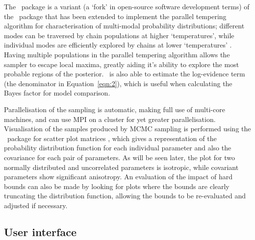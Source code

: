 \documentclass[pdf,preprint]{iucr}
\begin{document}
The \ptemcee\ package is a variant (a `fork' in open-source software development terms) of the \emcee\ package that has been extended to implement the parallel tempering algorithm for characterisation of multi-modal probability distributions; different modes can be traversed by chain populations at higher `temperatures', while individual modes are efficiently explored by chains at lower `temperatures' \cite{ptemcee}.  Having multiple populations in the parallel tempering algorithm allows the sampler to escape local maxima, greatly aiding it's ability to explore the most probable regions of the posterior.  \ptemcee\ is also able to estimate the log-evidence term (the denominator in Equation~\ref{eqn:2}), which is useful when calculating the Bayes factor for model comparison.

Parallelisation of the sampling is automatic, making full use of multi-core machines, and can use MPI on a cluster for yet greater parallelisation. Visualisation of the samples produced by MCMC sampling is performed using the \corner\ package for scatter plot matrices \cite{corner}, which gives a representation of the probability distribution function for each individual parameter and also the covariance for each pair of parameters. As will be seen later, the plot for two normally distributed and uncorrelated parameters is isotropic, while covariant parameters show significant anisotropy. An evaluation of the impact of hard bounds can also be made by looking for plots where the bounds are clearly truncating the distribution function, allowing the bounds to be re-evaluated and adjusted if necessary.

\subsection{User interface}
\end{document}
